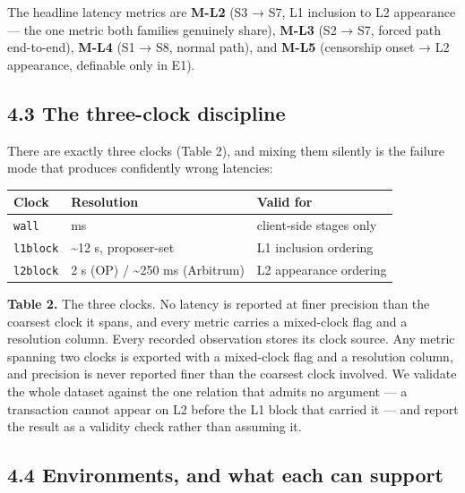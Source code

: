 \documentclass[conference]{IEEEtran}
\renewcommand{\_}{\textunderscore\allowbreak}
\begin{document}
The headline latency metrics are \textbf{M-L2} (S3 → S7, L1 inclusion to
L2 appearance --- the one metric both families genuinely share),
\textbf{M-L3} (S2 → S7, forced path end-to-end), \textbf{M-L4} (S1 → S8,
normal path), and \textbf{M-L5} (censorship onset → L2 appearance,
definable only in E1).

\subsection{4.3 The three-clock
discipline}\label{the-three-clock-discipline}

There are exactly three clocks (Table 2), and mixing them silently is
the failure mode that produces confidently wrong latencies:

\begin{table}[!t]
\centering
\small
\begin{tabular}{@{}lll@{}}
\toprule
Clock & Resolution & Valid for \\
\midrule
\texttt{wall} & ms & client-side stages only \\
\texttt{l1\_block} & \textasciitilde12 s, proposer-set & L1 inclusion
ordering \\
\texttt{l2\_block} & 2 s (OP) / \textasciitilde250 ms (Arbitrum) & L2
appearance ordering \\
\bottomrule
\end{tabular}
\par\vspace{5pt}
{\footnotesize\raggedright \textbf{Table 2.} The three clocks. No latency is reported at finer
precision than the coarsest clock it spans, and every metric carries a
mixed-clock flag and a resolution column. Every recorded observation
stores its clock source. Any metric spanning two clocks is exported with
a mixed-clock flag and a resolution column, and precision is never
reported finer than the coarsest clock involved. We validate the whole
dataset against the one relation that admits no argument --- a
transaction cannot appear on L2 before the L1 block that carried it ---
and report the result as a validity check rather than assuming it.\par}
\end{table}

\subsection{4.4 Environments, and what each can
support}\label{environments-and-what-each-can-support}
\end{document}
